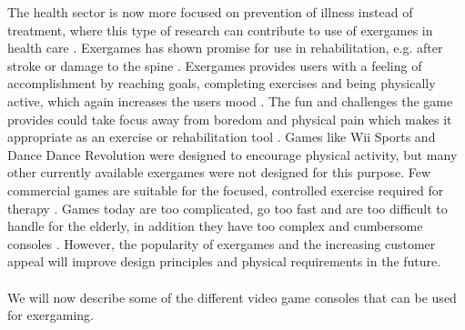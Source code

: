 The health sector is now more focused on prevention of illness instead of treatment, where this type of research can contribute to use of exergames in health care \cite{gamingforhealth}. Exergames has shown promise for use in rehabilitation, e.g. after stroke or damage to the spine \cite{lange2011development}. Exergames provides users with a feeling of accomplishment by reaching goals, completing exercises and being physically active, which again increases the users mood \cite{staiano2011exergames}. The fun and challenges the game provides could take focus away from boredom and physical pain which makes it appropriate as an exercise or rehabilitation tool \cite{roleofvideogames} \cite{exergamesforelderly}. Games like Wii Sports and Dance Dance Revolution were designed to encourage physical activity, but many other currently available exergames were not designed for this purpose. Few commercial games are suitable for the focused, controlled exercise required for therapy \cite{lange2011development}. Games today are too complicated, go too fast and are too difficult to handle for the elderly, in addition they have too complex and cumbersome consoles \cite{exergamesforelderly}. However, the popularity of exergames and the increasing customer appeal will improve design principles and physical requirements in the future\cite{chamberlin2008exergames}. \\ \\
We will now describe some of the different video game consoles that can be used for exergaming.
